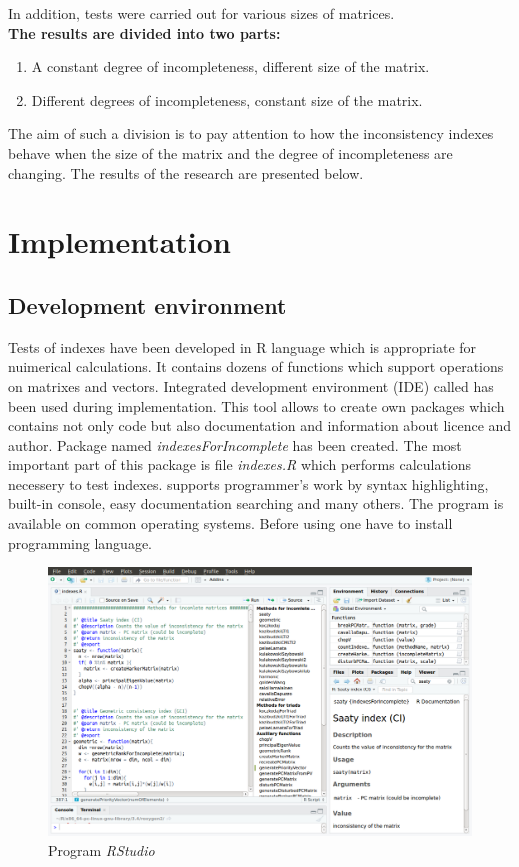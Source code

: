 In addition, tests were carried out for various sizes of matrices.\\
\textbf{The results are divided into two parts:}
\begin{enumerate}
  \item A constant degree of incompleteness, different size of the matrix.
  \item Different degrees of incompleteness, constant size of the matrix.
\end{enumerate}

The aim of such a division is to pay attention to how the inconsistency indexes behave when the size of the matrix and the degree of incompleteness are changing. The results of the research are presented below.


\section{Implementation}

\subsection{Development environment}
Tests of indexes have been developed in R language which is appropriate for nuimerical calculations. It contains dozens of functions which support operations on matrixes and vectors. Integrated development environment (IDE) called  has been used during implementation. This tool allows to create own packages which contains not only code but also documentation and information about licence and author. Package named \textit{indexesForIncomplete} has been created. The most important part of this package is file \textit{indexes.R} which performs calculations necessery to test indexes.  supports programmer's work by syntax highlighting, built-in console, easy documentation searching and many others. The program is available on common operating systems. Before using  one have to install  programming language.  
\begin{figure}[h]
\centerline{\includegraphics[width=\textwidth]{images/rstudio.png}}
\caption{Program \textit{RStudio}}
\label{fig:rstudio}
\end{figure}


